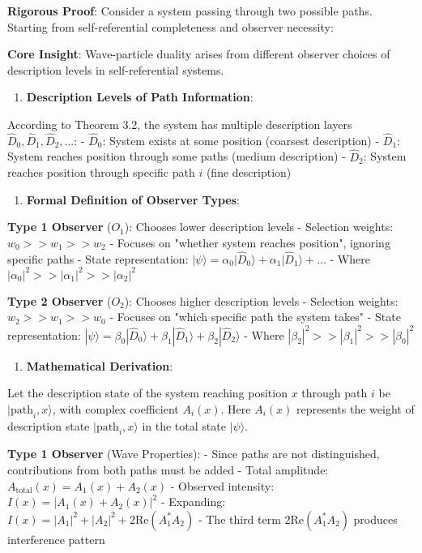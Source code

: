 \textbf{Rigorous Proof}:
Consider a system passing through two possible paths. Starting from self-referential completeness and observer necessity:

\textbf{Core Insight}: Wave-particle duality arises from different observer choices of description levels in self-referential systems.

\begin{enumerate}
\item \textbf{Description Levels of Path Information}:
\end{enumerate}
   
   According to Theorem 3.2, the system has multiple description layers ${\hat{D}_0, \hat{D}_1, \hat{D}_2, ...}$:
   - $\hat{D}_0$: System exists at some position (coarsest description)
   - $\hat{D}_1$: System reaches position through some paths (medium description)
   - $\hat{D}_2$: System reaches position through specific path $i$ (fine description)
   
\begin{enumerate}
\item \textbf{Formal Definition of Observer Types}:
\end{enumerate}
   
   \textbf{Type 1 Observer} ($O_1$): Chooses lower description levels
   - Selection weights: $w_0 >> w_1 >> w_2$
   - Focuses on "whether system reaches position", ignoring specific paths
   - State representation: $|\psi\rangle = \alpha_0|\hat{D}_0\rangle + \alpha_1|\hat{D}_1\rangle + ...$
   - Where $|\alpha_0|^2 >> |\alpha_1|^2 >> |\alpha_2|^2$
   
   \textbf{Type 2 Observer} ($O_2$): Chooses higher description levels
   - Selection weights: $w_2 >> w_1 >> w_0$
   - Focuses on "which specific path the system takes"
   - State representation: $|\psi\rangle = \beta_0|\hat{D}_0\rangle + \beta_1|\hat{D}_1\rangle + \beta_2|\hat{D}_2\rangle$
   - Where $|\beta_2|^2 >> |\beta_1|^2 >> |\beta_0|^2$

\begin{enumerate}
\item \textbf{Mathematical Derivation}:
\end{enumerate}
   
   Let the description state of the system reaching position $x$ through path $i$ be $|\text{path}_i, x\rangle$, with complex coefficient $A_i(x)$. Here $A_i(x)$ represents the weight of description state $|\text{path}_i, x\rangle$ in the total state $|\psi\rangle$.
   
   \textbf{Type 1 Observer} (Wave Properties):
   - Since paths are not distinguished, contributions from both paths must be added
   - Total amplitude: $A_{\text{total}}(x) = A_1(x) + A_2(x)$
   - Observed intensity: $I(x) = |A_1(x) + A_2(x)|^2$
   - Expanding: $I(x) = |A_1|^2 + |A_2|^2 + 2\text{Re}(A_1^*A_2)$
   - The third term $2\text{Re}(A_1^*A_2)$ produces interference pattern
   
